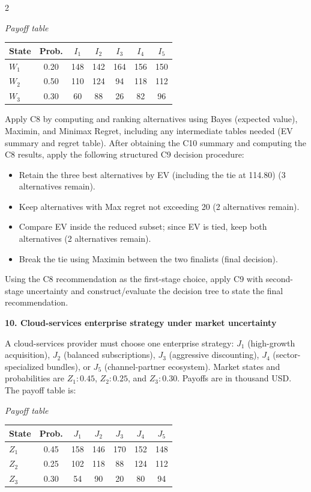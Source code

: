 \documentclass[12pt]{article}
\newcommand{\SubsectionBox}[1]{%
	\noindent\colorbox{gray!30}{%
		\parbox{\linewidth}{\textbf{#1}}%
	}\par\vspace{0.35cm}%
}
\begin{document}
\begin{multicols}{2}
		\begin{center}
			\textit{Payoff table} \\
			\begin{tabular}{l c c c c c c}
				\hline
				State& Prob. & $I_1$ & $I_2$ & $I_3$ & $I_4$ & $I_5$ \\
				\hline
				$W_1$ & 0.20 & 148 & 142 & 164 & 156 & 150 \\
				$W_2$ & 0.50 & 110 & 124 & 94 & 118 & 112 \\
				$W_3$ & 0.30 & 60 & 88 & 26 & 82 & 96 \\
				\hline
			\end{tabular}
		\end{center}
		
		Apply C8 by computing and ranking alternatives using Bayes (expected value), Maximin, and Minimax Regret, including any intermediate tables needed (EV summary and regret table).
		After obtaining the C10 summary and computing the C8 results, apply the following structured C9 decision procedure:
		\begin{itemize}
			\item Retain the three best alternatives by EV (including the tie at 114.80) (3 alternatives remain).
			\item Keep alternatives with Max regret not exceeding 20 (2 alternatives remain).
			\item Compare EV inside the reduced subset; since EV is tied, keep both alternatives (2 alternatives remain).
			\item Break the tie using Maximin between the two finalists (final decision).
		\end{itemize}
		Using the C8 recommendation as the first-stage choice, apply C9 with second-stage uncertainty and construct/evaluate the decision tree to state the final recommendation.

		\vspace{0.25cm}
		\SubsectionBox{10. Cloud-services enterprise strategy under market uncertainty}\vspace{-0.25cm}
		A cloud-services provider must choose one enterprise strategy: $J_1$ (high-growth acquisition), $J_2$ (balanced subscriptions), $J_3$ (aggressive discounting), $J_4$ (sector-specialized bundles), or $J_5$ (channel-partner ecosystem).
		Market states and probabilities are $Z_1:0.45$, $Z_2:0.25$, and $Z_3:0.30$. Payoffs are in thousand USD. The payoff table is:
		
		\begin{center}
			\textit{Payoff table} \\
			\begin{tabular}{l c c c c c c}
				\hline
				State& Prob. & $J_1$ & $J_2$ & $J_3$ & $J_4$ & $J_5$ \\
				\hline
				$Z_1$ & 0.45 & 158 & 146 & 170 & 152 & 148 \\
				$Z_2$ & 0.25 & 102 & 118 & 88 & 124 & 112 \\
				$Z_3$ & 0.30 & 54 & 90 & 20 & 80 & 94 \\
				\hline
			\end{tabular}
		\end{center}
		

\end{multicols}
\end{document}
